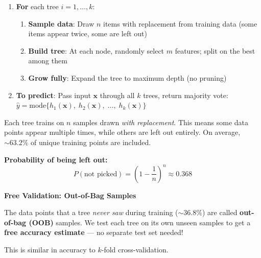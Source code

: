 \documentclass[10pt,a4paper]{article}
\begin{document}
\begin{algbox}
\begin{enumerate}
  \item \textbf{For} each tree $i = 1, \ldots, k$:
  \begin{enumerate}[label=(\alph*)]
    \item \textbf{Sample data}: Draw $n$ items with replacement from training data (some items appear twice, some are left out)
    \item \textbf{Build tree}: At each node, randomly select $m$ features; split on the best among them
    \item \textbf{Grow fully}: Expand the tree to maximum depth (no pruning)
  \end{enumerate}
  \item \textbf{To predict}: Pass input $\mathbf{x}$ through all $k$ trees, return majority vote:
  $\displaystyle \hat{y} = \text{mode}\bigl\{h_1(\mathbf{x}),\; h_2(\mathbf{x}),\; \ldots,\; h_k(\mathbf{x})\bigr\}$
\end{enumerate}
\end{algbox}

\vspace{4pt}

\begin{minipage}[t]{0.50\textwidth}
\begin{defbox}
Each tree trains on $n$ samples drawn \textit{with replacement}. This means some data points appear multiple times, while others are left out entirely. On average, $\sim63.2\%$ of unique training points are included.

\medskip
\textbf{Probability of being left out:}
\[
P(\text{not picked}) = \left(1 - \frac{1}{n}\right)^n \approx 0.368
\]
\end{defbox}
\end{minipage}\hfill
\begin{minipage}[t]{0.46\textwidth}
\begin{notebox}
\textbf{\color{purple}Free Validation: Out-of-Bag Samples}
\smallskip

The data points that a tree \textit{never saw} during training ($\sim36.8\%$) are called \textbf{out-of-bag (OOB)} samples. We test each tree on its own unseen samples to get a \textbf{free accuracy estimate} --- no separate test set needed!

\smallskip
This is similar in accuracy to $k$-fold cross-validation.
\end{notebox}
\end{minipage}
\end{document}
